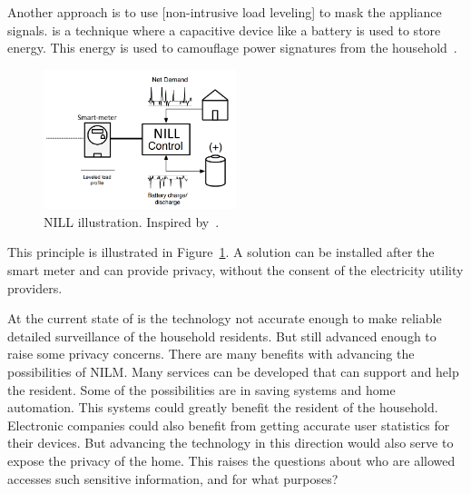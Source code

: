 Another approach is to use [non-intrusive load leveling] to mask the appliance signals.  is a technique where a capacitive device like a battery is used to store energy. This energy is used to camouflage power signatures from the household~\citep{RefWorks:36}. 

\begin{figure}[H]
\centering
\includegraphics[width=0.5\textwidth]{billeder/NILLILU.png}
\caption[NILL illustration.]{NILL illustration. Inspired by~\citep{RefWorks:36}.}
\label{fig:NILL}
\end{figure}

This principle is illustrated in Figure~\ref{fig:NILL}. A  solution can be installed after the smart meter and can provide privacy, without the consent of the electricity utility providers.

At the current state of  is the technology not accurate enough to make reliable detailed surveillance of the household residents. But still advanced enough to raise some privacy concerns. There are many benefits with advancing the possibilities of NILM. Many services can be developed that can support and help the resident. Some of the possibilities are in saving systems and home automation. This systems could greatly benefit the resident of the household. Electronic companies could also benefit from getting accurate user statistics for their devices. But advancing the technology in this direction would also serve to expose the privacy of the home. This raises the questions about who are allowed accesses such sensitive information, and for what purposes?